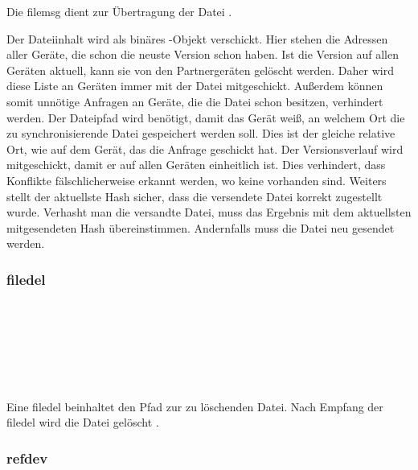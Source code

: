 Die \gls{filemsg} dient zur Übertragung der Datei .
\begin{description}
		Der Dateiinhalt wird als binäres -Objekt verschickt.
		Hier stehen die Adressen aller Geräte, die schon die neuste Version schon haben. Ist die Version auf allen Geräten aktuell, kann sie von den Partnergeräten gelöscht werden. Daher wird diese Liste an Geräten immer mit der Datei mitgeschickt. Außerdem können somit unnötige Anfragen an Geräte, die die Datei schon besitzen, verhindert werden.
		Der Dateipfad wird benötigt, damit das Gerät weiß, an welchem Ort die zu synchronisierende Datei gespeichert werden soll. Dies ist der gleiche relative Ort, wie auf dem Gerät, das die Anfrage geschickt hat.
		Der Versionsverlauf wird mitgeschickt, damit er auf allen Geräten einheitlich ist. Dies verhindert, dass Konflikte fälschlicherweise erkannt werden, wo keine vorhanden sind. Weiters stellt der aktuellste Hash sicher, dass die versendete Datei korrekt zugestellt wurde. Verhasht man die versandte Datei, muss das Ergebnis mit dem aktuellsten mitgesendeten Hash übereinstimmen. Andernfalls muss die Datei neu gesendet werden.
\end{description}
		
\subsubsection{\gls{filedel}}
\messagestart
	 \\
	
	\begin{rightwordgroup}{\isprotomsgtype}
	\end{rightwordgroup} \\
	
	\begin{rightwordgroup}{\isprotomsgdata}
		 \\
		\skippedwords \\
	\end{rightwordgroup}
	
Eine \gls{filedel} beinhaltet den Pfad zur zu löschenden Datei. Nach Empfang der \gls{filedel} wird die Datei gelöscht .

\subsubsection{\gls{refdev}}
\messagestart
	 \\
	
